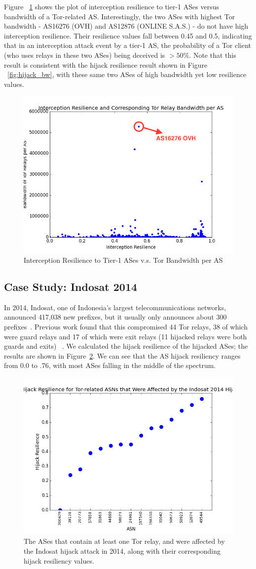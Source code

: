 Figure ~\ref{fig:interception_bw} shows the plot of interception resilience to tier-1 ASes versus bandwidth of a Tor-related AS. Interestingly, the two ASes with highest Tor bandwidth - AS16276 (OVH) and AS12876 (ONLINE S.A.S.) - do not have high interception resilience. Their resilience values fall between 0.45 and 0.5, indicating that in an interception attack event by a tier-1 AS, the probability of a Tor client (who uses relays in these two ASes) being deceived is $> 50\%$. Note that this result is consistent with the hijack resilience result shown in Figure ~\ref{fig:hijack_bw}, with these same two ASes of high bandwidth yet low resilience values. 

\begin{figure}[ht!]
\centering
\includegraphics[width=.4\textwidth]{interception_bandwidth}
\caption{Interception Resilience to Tier-1 ASes v.s. Tor Bandwidth per AS}
\label{fig:interception_bw}
\end{figure}

\subsection{Case Study: Indosat 2014}
In 2014, Indosat, one of Indonesia's largest telecommunications networks, announced 417,038 new prefixes, but it usually only announces about 300 prefixes~\cite{indosat2014}.  Previous work found that this compromised 44 Tor relays, 38 of which were guard relays and 17 of which were exit relays (11 hijacked relays were both guards and exits) ~\cite{sun2015raptor}.  We calculated the hijack resilience of the hijacked ASes; the results are shown in Figure~\ref{fig:case_study}.  We can see that the AS hijack resiliency ranges from 0.0 to .76, with most ASes falling in the middle of the spectrum. 


\begin{figure}
\centering
\includegraphics[width=.4\textwidth]{case_study_graph}
\caption{The ASes that contain at least one Tor relay, and were affected by the Indosat hijack attack in 2014, along with their corresponding hijack resiliency values.}
\label{fig:case_study}
\end{figure}
